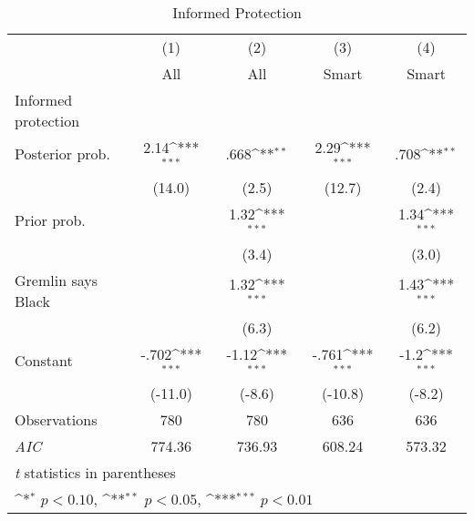 \begin{table}[htbp]\centering
\def\sym#1{\ifmmode^{#1}\else\(^{#1}\)\fi}
\caption{Informed Protection}
\begin{tabular}{l*{4}{c}}
\hline\hline
                &\multicolumn{1}{c}{(1)}&\multicolumn{1}{c}{(2)}&\multicolumn{1}{c}{(3)}&\multicolumn{1}{c}{(4)}\\
                &\multicolumn{1}{c}{All}&\multicolumn{1}{c}{All}&\multicolumn{1}{c}{Smart}&\multicolumn{1}{c}{Smart}\\
\hline
Informed protection&                  &                  &                  &                  \\
Posterior prob. &     2.14\sym{***}&     .668\sym{**} &     2.29\sym{***}&     .708\sym{**} \\
                &   (14.0)         &    (2.5)         &   (12.7)         &    (2.4)         \\
Prior prob.     &                  &     1.32\sym{***}&                  &     1.34\sym{***}\\
                &                  &    (3.4)         &                  &    (3.0)         \\
Gremlin says Black&                  &     1.32\sym{***}&                  &     1.43\sym{***}\\
                &                  &    (6.3)         &                  &    (6.2)         \\
Constant        &    -.702\sym{***}&    -1.12\sym{***}&    -.761\sym{***}&     -1.2\sym{***}\\
                &  (-11.0)         &   (-8.6)         &  (-10.8)         &   (-8.2)         \\
\hline
Observations    &      780         &      780         &      636         &      636         \\
\textit{AIC}    &   774.36         &   736.93         &   608.24         &   573.32         \\
\hline\hline
\multicolumn{5}{l}{\footnotesize \textit{t} statistics in parentheses}\\
\multicolumn{5}{l}{\footnotesize \sym{*} \(p<0.10\), \sym{**} \(p<0.05\), \sym{***} \(p<0.01\)}\\
\end{tabular}
\end{table}
